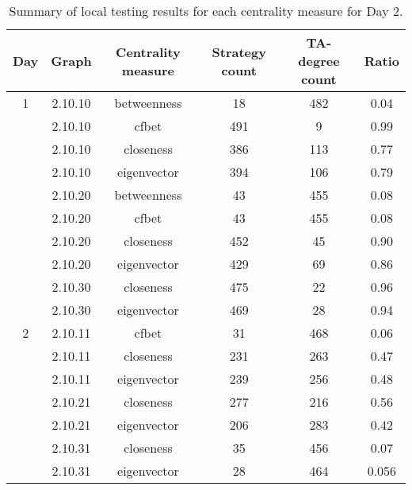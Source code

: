 \documentclass[letterpaper, 11pt]{article}
\begin{document}
\begin{table}\centering
\begin{tabular}{cccccc}
Day & Graph & Centrality measure & Strategy count & TA-degree count & Ratio \\ \hline
\toprule
\multirow{1}{*}{1}
& 2.10.10 & betweenness & 18 & 482 & 0.04 \\
& 2.10.10 & cfbet & 491 & 9 & 0.99 \\ 
& 2.10.10 & closeness & 386 & 113 & 0.77 \\
& 2.10.10 & eigenvector & 394 & 106 & 0.79\\ \cmidrule{2-6}

& 2.10.20 & betweenness & 43 & 455 & 0.08 \\
& 2.10.20 & cfbet & 43 & 455 & 0.08 \\ 
& 2.10.20 & closeness & 452 & 45 & 0.90\\
& 2.10.20 & eigenvector & 429 & 69 & 0.86\\ \cmidrule{2-6}

& 2.10.30 & closeness & 475 & 22 & 0.96\\
& 2.10.30 & eigenvector & 469 & 28 & 0.94\\
\midrule

\multirow{1}{*}{2}
& 2.10.11 & cfbet & 31 & 468 & 0.06\\
& 2.10.11 & closeness & 231 & 263 & 0.47 \\
& 2.10.11 & eigenvector & 239 & 256 & 0.48\\ \cmidrule{2-6}

& 2.10.21 & closeness & 277 & 216 & 0.56 \\
& 2.10.21 & eigenvector & 206 & 283 & 0.42\\ \cmidrule{2-6}

& 2.10.31 & closeness & 35 & 456 & 0.07 \\
& 2.10.31 & eigenvector & 28 & 464 & 0.056 \\
\bottomrule
\end{tabular}
\caption{Summary of local testing results for each centrality measure for Day 2.}
\label{table:day2}
\end{table}
\end{document}
